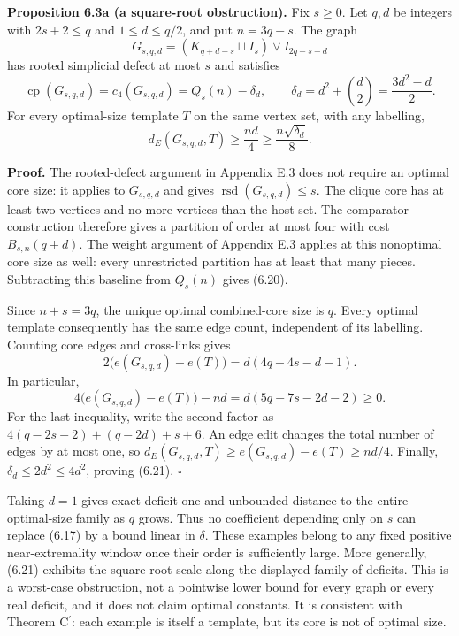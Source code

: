 \documentclass[english,11pt,a4paper]{article}
\begin{document}

\textbf{Proposition 6.3a (a square-root obstruction).} Fix \(s\ge0\). Let \(q,d\) be integers with \(2s+2\le q\) and \(1\le d\le q/2\), and put \(n=3q-s\). The graph \[
G_{s,q,d}=(K_{q+d-s}\sqcup I_s)\vee I_{2q-s-d}
\] has rooted simplicial defect at most \(s\) and satisfies \[
\operatorname{cp}(G_{s,q,d})=c_4(G_{s,q,d})
=Q_s(n)-\delta_d,\qquad
\delta_d=d^2+\binom d2=\frac{3d^2-d}{2}.
\tag{6.20}
\] For every optimal-size template \(T\) on the same vertex set, with any labelling, \[
d_E(G_{s,q,d},T)\ge\frac{nd}{4}
\ge\frac{n\sqrt{\delta_d}}8.
\tag{6.21}
\]

\textbf{Proof.} The rooted-defect argument in Appendix E.3 does not require an optimal core size: it applies to \(G_{s,q,d}\) and gives \(\operatorname{rsd}(G_{s,q,d})\le s\). The clique core has at least two vertices and no more vertices than the host set. The comparator construction therefore gives a partition of order at most four with cost \(B_{s,n}(q+d)\). The weight argument of Appendix E.3 applies at this nonoptimal core size as well: every unrestricted partition has at least that many pieces. Subtracting this baseline from \(Q_s(n)\) gives (6.20).

Since \(n+s=3q\), the unique optimal combined-core size is \(q\). Every optimal template consequently has the same edge count, independent of its labelling. Counting core edges and cross-links gives \[
2\bigl(e(G_{s,q,d})-e(T)\bigr)
=d(4q-4s-d-1).
\] In particular, \[
4\bigl(e(G_{s,q,d})-e(T)\bigr)-nd
=d(5q-7s-2d-2)\ge0.
\] For the last inequality, write the second factor as \(4(q-2s-2)+(q-2d)+s+6\). An edge edit changes the total number of edges by at most one, so \(d_E(G_{s,q,d},T)\ge e(G_{s,q,d})-e(T)\ge nd/4\). Finally, \(\delta_d\le2d^2\le4d^2\), proving (6.21). \(\square\)

Taking \(d=1\) gives exact deficit one and unbounded distance to the entire optimal-size family as \(q\) grows. Thus no coefficient depending only on \(s\) can replace (6.17) by a bound linear in \(\delta\). These examples belong to any fixed positive near-extremality window once their order is sufficiently large. More generally, (6.21) exhibits the square-root scale along the displayed family of deficits. This is a worst-case obstruction, not a pointwise lower bound for every graph or every real deficit, and it does not claim optimal constants. It is consistent with Theorem \texorpdfstring{C\ensuremath{^{\prime}}}{C'}: each example is itself a template, but its core is not of optimal size.
\end{document}
